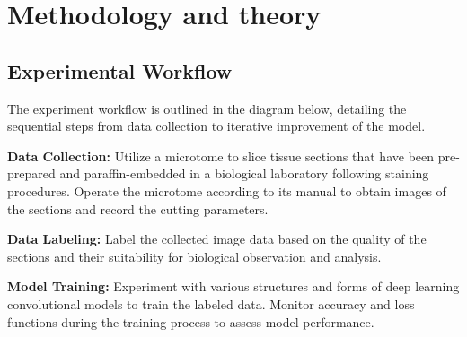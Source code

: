 \section{Methodology and theory}
\label{sec:problem_description}

\subsection{Experimental Workflow}

The experiment workflow is outlined in the diagram below, detailing the sequential steps from data collection to iterative improvement of the model.

\begin{center}
\end{center}

\textbf{Data Collection:} Utilize a microtome to slice tissue sections that have been pre-prepared and paraffin-embedded in a biological laboratory following staining procedures. Operate the microtome according to its manual to obtain images of the sections and record the cutting parameters.

\textbf{Data Labeling:} Label the collected image data based on the quality of the sections and their suitability for biological observation and analysis.

\textbf{Model Training:} Experiment with various structures and forms of deep learning convolutional models to train the labeled data. Monitor accuracy and loss functions during the training process to assess model performance.

